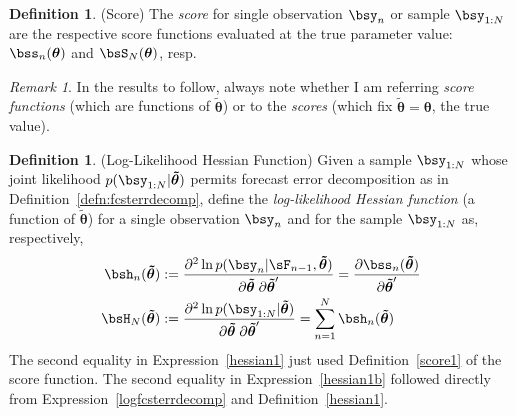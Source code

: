 \documentclass[12pt]{article}
\theoremstyle{plain}
\theoremstyle{definition}
\newtheorem{defn}[thm]{Definition}
\theoremstyle{remark}
\newtheorem*{rmk}{Remark}
\newcommand{\bstheta}{\boldsymbol{\theta}}
\newcommand{\bstildetheta}{\boldsymbol{\tilde{\theta}}}
\newcommand{\sumnN}{\sum^N_{n=1}}
\begin{document}
\begin{defn}(Score)
The \emph{score} for single observation $\bsy_n$ or sample $\bsy_{1:N}$
are the respective score functions evaluated at the true parameter value:
$\bss_n(\bstheta)$ and $\bsS_N(\bstheta)$, resp.
\end{defn}
\begin{rmk}
In the results to follow, always note whether I am referring
\emph{score functions} (which are functions of $\bstildetheta$)
or to the \emph{scores} (which fix $\bstildetheta=\bstheta$, the true
value).
\end{rmk}

\begin{defn}(Log-Likelihood Hessian Function)
\label{defn:hessian}
Given a sample $\bsy_{1:N}$ whose joint likelihood
$p(\bsy_{1:N}|\bstildetheta)$ permits forecast error decomposition as in
Definition~\ref{defn:fcsterrdecomp}, define the
\emph{log-likelihood Hessian function} (a function of $\bstildetheta$)
for a single observation $\bsy_n$ and for the sample $\bsy_{1:N}$ as,
respectively,
\begin{alignat}{3}
  \bsh_n(\bstildetheta)
  &:=
  \frac{\partial^2 \ln p(\bsy_n|\sF_{n-1},\bstildetheta)
    }{\partial \bstildetheta\;\partial\bstildetheta'}
  =
  \frac{\partial \bss_n(\bstildetheta) }{\partial \bstildetheta'}
  \label{hessian1}
  \\
  \bsH_N(\bstildetheta)
  &:=
  \frac{\partial^2 \ln p(\bsy_{1:N}|\bstildetheta)}{
    \partial \bstildetheta\;\partial\bstildetheta'}
  = \sumnN \bsh_n(\bstildetheta)
  \label{hessian1b}
\end{alignat}
The second equality in Expression~\ref{hessian1} just used
Definition~\ref{score1} of the score function.
The second equality in Expression~\ref{hessian1b} followed directly from
Expression~\ref{logfcsterrdecomp} and Definition~\ref{hessian1}.
\end{defn}
\end{document}
